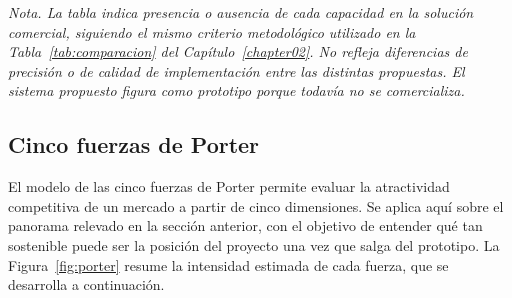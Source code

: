 \begin{table}[H]
\centering
\caption[Comparación de soluciones comerciales de monitoreo.]{Comparación de soluciones comerciales disponibles para el monitoreo de adultos mayores. Fuente: Elaboración propia.}
\vspace{0.3cm}
\label{tab:comparativa_comercial}
\begingroup
\renewcommand{\arraystretch}{1.6}
\setlength{\tabcolsep}{10pt}
\endgroup
\end{table}

{\footnotesize\textit{Nota. La tabla indica presencia o ausencia de cada capacidad en la solución comercial, siguiendo el mismo criterio metodológico utilizado en la Tabla~\ref{tab:comparacion} del Capítulo~\ref{chapter02}.
No refleja diferencias de precisión o de calidad de implementación entre las distintas propuestas.
El sistema propuesto figura como prototipo porque todavía no se comercializa.}}

\subsection{Cinco fuerzas de Porter}
\label{sec:porter}

El modelo de las cinco fuerzas de Porter \parencite{Porter2008} permite evaluar la atractividad competitiva de un mercado a partir de cinco dimensiones.
Se aplica aquí sobre el panorama relevado en la sección anterior, con el objetivo de entender qué tan sostenible puede ser la posición del proyecto una vez que salga del prototipo.
La Figura~\ref{fig:porter} resume la intensidad estimada de cada fuerza, que se desarrolla a continuación.

